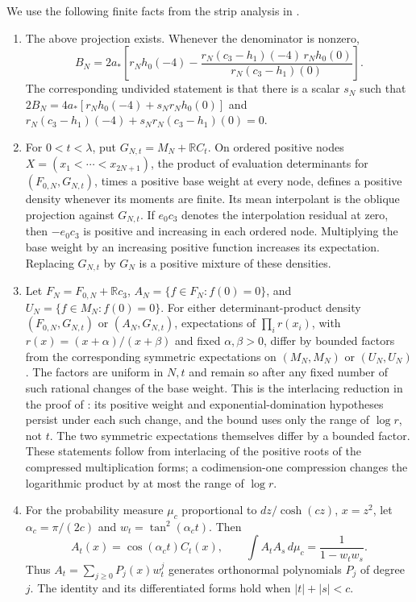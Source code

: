 \documentclass[11pt]{article}
\numberwithin{equation}{section}
\theoremstyle{definition}\newtheorem{definition}[theorem]{Definition}
\theoremstyle{remark}\newtheorem{remark}[theorem]{Remark}
\begin{document}
We use the following finite facts from the strip analysis in
\cite[Theorem 2.1 and Lemmas 3.1--3.4]{UniformMarked}.
\begin{enumerate}
\item The above projection exists.  Whenever the denominator is nonzero,
\begin{equation}\label{c:strip-residual-formula}
 B_N=2a_*\left[
 r_Nh_0(-4)-
 \frac{r_N(c_3-h_1)(-4)\,r_Nh_0(0)}{r_N(c_3-h_1)(0)}
 \right].
\end{equation}
The corresponding undivided statement is that there is a scalar $s_N$ such that
$2B_N=4a_*[r_Nh_0(-4)+s_Nr_Nh_0(0)]$ and
$r_N(c_3-h_1)(-4)+s_Nr_N(c_3-h_1)(0)=0$.

\item For $0<t<\lambda$, put $G_{N,t}=M_N+\mathbb R C_t$.
On ordered positive nodes $X=(x_1<\cdots<x_{2N+1})$, the product of
evaluation determinants for $(F_{0,N},G_{N,t})$, times a positive
base weight at every node, defines a positive density whenever its
moments are finite.  Its mean interpolant is the oblique projection
against $G_{N,t}$.  If $e_0c_3$ denotes the interpolation residual at
zero, then $-e_0c_3$ is positive and increasing in each ordered node.
Multiplying the base weight by an increasing positive function increases
its expectation.  Replacing $G_{N,t}$ by $G_N$ is a positive mixture
of these densities.

\item Let $F_N=F_{0,N}+\mathbb R c_3$,
$A_N=\{f\in F_N:f(0)=0\}$, and
$U_N=\{f\in M_N:f(0)=0\}$.  For either determinant-product density
$(F_{0,N},G_{N,t})$ or $(A_N,G_{N,t})$, expectations of
$\prod_i r(x_i)$, with $r(x)=(x+\alpha)/(x+\beta)$ and fixed
$\alpha,\beta>0$, differ by bounded factors from the corresponding
symmetric expectations on $(M_N,M_N)$ or $(U_N,U_N)$.
The factors are uniform in $N,t$ and remain so after any fixed number
of such rational changes of the base weight. This is the interlacing
reduction in the proof of \cite[Lemma 3.2]{UniformMarked}: its positive
weight and exponential-domination hypotheses persist under each such
change, and the bound uses only the range of $\log r$, not $t$.  The two symmetric
expectations themselves differ by a bounded factor.  These statements
follow from interlacing of the positive roots of the compressed
multiplication forms; a codimension-one compression changes the
logarithmic product by at most the range of $\log r$.

\item For the probability measure $\mu_c$ proportional to
$dz/\cosh(cz)$, $x=z^2$, let
$\alpha_c=\pi/(2c)$ and $w_t=\tan^2(\alpha_ct)$.
Then
\begin{equation}\label{c:polynomial-generator}
 A_t(x)=\cos(\alpha_ct)C_t(x),\qquad
 \int A_tA_s\,d\mu_c=\frac1{1-w_tw_s}.
\end{equation}
Thus $A_t=\sum_{j\ge0}P_j(x)w_t^j$ generates orthonormal polynomials
$P_j$ of degree $j$.  The identity and its differentiated forms hold
when $|t|+|s|<c$.
\end{enumerate}
\end{document}
